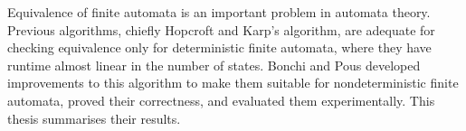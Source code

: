 Equivalence of finite automata is an important problem in automata theory.
Previous algorithms, chiefly Hopcroft and Karp's algorithm, are adequate
  for checking equivalence only for deterministic finite automata, where they
  have runtime almost linear in the number of states.
Bonchi and Pous developed improvements to this algorithm to make them suitable
  for nondeterministic finite automata, proved their correctness, and evaluated them experimentally.
This thesis summarises their results.
